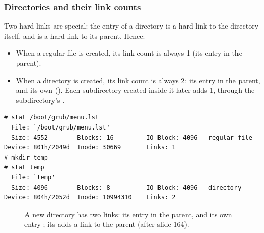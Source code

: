 \subsubsection{Directories and their link counts}
Two hard links are special: the entry  of a directory is a hard link to the directory itself, and  is a hard link to its parent. Hence:
\begin{itemize}
  \item When a regular file is created, its link count is always 1 (its entry in the parent).
  \item When a directory is created, its link count is always 2: its entry in the parent, and its own  (). Each subdirectory created inside it later adds 1, through the subdirectory's .
\end{itemize}
\begin{lstlisting}[style=sh]
# stat /boot/grub/menu.lst
  File: `/boot/grub/menu.lst'
  Size: 4552        Blocks: 16         IO Block: 4096   regular file
Device: 801h/2049d  Inode: 30669       Links: 1
# mkdir temp
# stat temp
  File: `temp'
  Size: 4096        Blocks: 8          IO Block: 4096   directory
Device: 804h/2052d  Inode: 10994310    Links: 2
\end{lstlisting}

\begin{figure}[H]
\centering
\renewcommand{\extfont}{\scriptsize}\renewcommand{\extrowh}{0.45}
\caption{A new directory has two links: its entry in the parent, and its own entry ; its  adds a link to the parent (after slide 164).}
\label{fig:dirlinks}
\end{figure}

